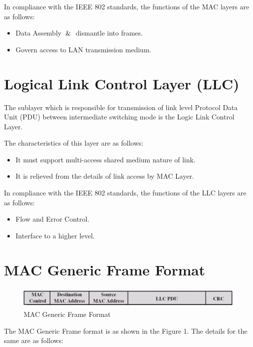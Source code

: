 \documentclass[12pt]{article}
\begin{document}
In compliance with the IEEE 802 standards, the functions of the MAC layers are as follows:
\begin{itemize}
    \item Data Assembly $\And$ dismantle into frames.
    \item Govern access to LAN transmission medium.
\end{itemize}


\section{Logical Link Control Layer (LLC)}
The sublayer which is responsible for transmission of link level Protocol Data Unit (PDU) between intermediate switching mode is the Logic Link Control Layer.

The characteristics of this layer are as follows: 
\begin{itemize}
    \item It must support multi-access shared medium nature of link.
    \item It is relieved from the details of link access by MAC Layer.
\end{itemize}

In compliance with the IEEE 802 standards, the functions of the LLC layers are as follows:
\begin{itemize}
    \item Flow and Error Control.
    \item Interface to a higher level.
\end{itemize}


\section{MAC Generic Frame Format}

\begin{figure}
    \centering
    \includegraphics[width=15cm, height=1cm]{mac_frame.png}
    \caption{MAC Generic Frame Format}
\end{figure}

The MAC Generic Frame format is as shown in the Figure 1. The details for the same are as follows:
\end{document}
